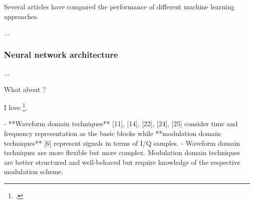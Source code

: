 Several articles have compared the performance of different machine learning approaches.

...

\subsubsection{Neural network architecture}

...


What about \parencite[pre][page 2]{youssef_machine_2017}?

I love \footcite[pre][post]{stankowicz_complex_2019}.


- **Waveform domain techniques** [11], [14], [22], [24], [25] consider time and frequency representation as the basic blocks while **modulation domain techniques** [6] represent signals in terms of I/Q samples.
- Waveform domain techniques are more flexible but more complex. Modulation domain techniques are better structured and well-behaved but require knowledge of the respective modulation scheme.
